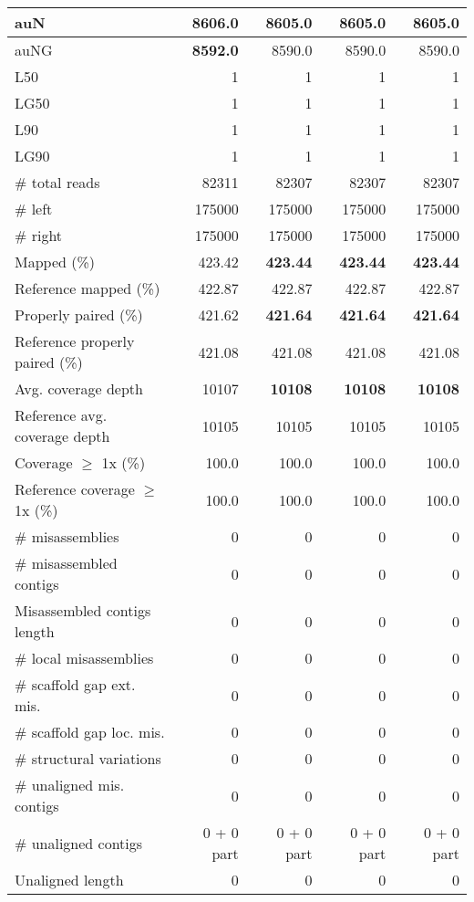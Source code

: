 \documentclass[12pt,a4paper]{article}
\begin{document}
\begin{table}[ht]
\begin{center}
\begin{tabular}{|l*{4}{|r}|}
auN & {\bf 8606.0} & 8605.0 & 8605.0 & 8605.0 \\ \hline
auNG & {\bf 8592.0} & 8590.0 & 8590.0 & 8590.0 \\ \hline
L50 & 1 & 1 & 1 & 1 \\ \hline
LG50 & 1 & 1 & 1 & 1 \\ \hline
L90 & 1 & 1 & 1 & 1 \\ \hline
LG90 & 1 & 1 & 1 & 1 \\ \hline
\# total reads & 82311 & 82307 & 82307 & 82307 \\ \hline
\# left & 175000 & 175000 & 175000 & 175000 \\ \hline
\# right & 175000 & 175000 & 175000 & 175000 \\ \hline
Mapped (\%) & 423.42 & {\bf 423.44} & {\bf 423.44} & {\bf 423.44} \\ \hline
Reference mapped (\%) & 422.87 & 422.87 & 422.87 & 422.87 \\ \hline
Properly paired (\%) & 421.62 & {\bf 421.64} & {\bf 421.64} & {\bf 421.64} \\ \hline
Reference properly paired (\%) & 421.08 & 421.08 & 421.08 & 421.08 \\ \hline
Avg. coverage depth & 10107 & {\bf 10108} & {\bf 10108} & {\bf 10108} \\ \hline
Reference avg. coverage depth & 10105 & 10105 & 10105 & 10105 \\ \hline
Coverage $\geq$ 1x (\%) & 100.0 & 100.0 & 100.0 & 100.0 \\ \hline
Reference coverage $\geq$ 1x (\%) & 100.0 & 100.0 & 100.0 & 100.0 \\ \hline
\# misassemblies & 0 & 0 & 0 & 0 \\ \hline
\# misassembled contigs & 0 & 0 & 0 & 0 \\ \hline
Misassembled contigs length & 0 & 0 & 0 & 0 \\ \hline
\# local misassemblies & 0 & 0 & 0 & 0 \\ \hline
\# scaffold gap ext. mis. & 0 & 0 & 0 & 0 \\ \hline
\# scaffold gap loc. mis. & 0 & 0 & 0 & 0 \\ \hline
\# structural variations & 0 & 0 & 0 & 0 \\ \hline
\# unaligned mis. contigs & 0 & 0 & 0 & 0 \\ \hline
\# unaligned contigs & 0 + 0 part & 0 + 0 part & 0 + 0 part & 0 + 0 part \\ \hline
Unaligned length & 0 & 0 & 0 & 0 \\ \hline

\end{tabular}
\end{center}
\end{table}
\end{document}
